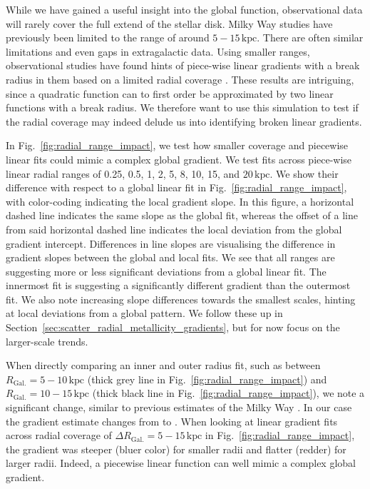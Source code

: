 \documentclass[fleqn,usenatbib]{mnras}
\begin{document}
While we have gained a useful insight into the global function, observational data will rarely cover the full extend of the stellar disk. Milky Way studies have previously been limited to the range of around $5-15\,\mathrm{kpc}$. There are often similar limitations and even gaps in extragalactic data. Using smaller ranges, observational studies have found hints of piece-wise linear gradients with a break radius in them based on a limited radial coverage \citep[e.g.][]{Andrievsky2002, Yong2012, Boeche2013, Hayden2014, Anders2017, Donor2020, Chen2023}. These results are intriguing, since a quadratic function can to first order be approximated by two linear functions with a break radius. We therefore want to use this simulation to test if the radial coverage may indeed delude us into identifying broken linear gradients.

In Fig.~\ref{fig:radial_range_impact}, we test how smaller coverage and piecewise linear fits could mimic a complex global gradient. We test fits across piece-wise linear radial ranges of 0.25, 0.5, 1, 2, 5, 8, 10, 15, and $20\,\mathrm{kpc}$. We show their difference with respect to a global linear fit in Fig.~\ref{fig:radial_range_impact}, with color-coding indicating the local gradient slope. In this figure, a horizontal dashed line indicates the same slope as the global fit, whereas the offset of a line from said horizontal dashed line indicates the local deviation from the global gradient intercept. Differences in line slopes are visualising the difference in gradient slopes between the global and local fits. We see that all ranges are suggesting more or less significant deviations from a global linear fit. The innermost fit is suggesting a significantly different gradient than the outermost fit. We also note increasing slope differences towards the smallest scales, hinting at local deviations from a global pattern. We follow these up in Section~\ref{sec:scatter_radial_metallicity_gradients}, but for now focus on the larger-scale trends.

When directly comparing an inner and outer radius fit, such as between $R_\mathrm{Gal.} = 5-10\,\mathrm{kpc}$ (thick grey line in Fig.~\ref{fig:radial_range_impact}) and $R_\mathrm{Gal.} = 10-15\,\mathrm{kpc}$ (thick black line in Fig.~\ref{fig:radial_range_impact}), we note a significant change, similar to previous estimates of the Milky Way \citep[e.g.][]{Yong2012, Lemasle2008}. In our case the gradient estimate changes from  to . When looking at linear gradient fits across radial coverage of $\Delta R_\mathrm{Gal.} = 5-15\,\mathrm{kpc}$ in Fig.~\ref{fig:radial_range_impact}, the gradient was steeper (bluer color) for smaller radii and flatter (redder) for larger radii. Indeed, a piecewise linear function can well mimic a complex global gradient.
\end{document}
